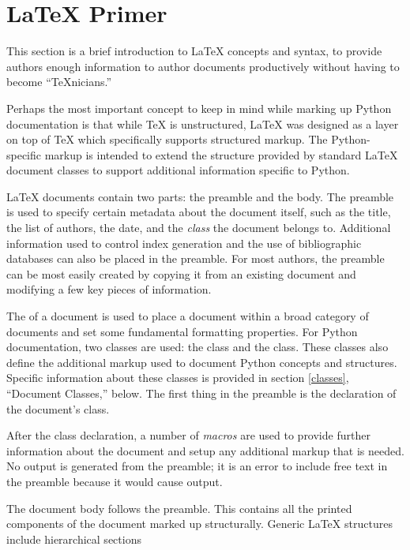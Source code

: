 \documentclass{howto}
\begin{document}
\section{\LaTeX{} Primer \label{latex-primer}}

  This section is a brief introduction to \LaTeX{} concepts and
  syntax, to provide authors enough information to author documents
  productively without having to become ``\TeX{}nicians.''

  Perhaps the most important concept to keep in mind while marking up
  Python documentation is that while \TeX{} is unstructured, \LaTeX{} was
  designed as a layer on top of \TeX{} which specifically supports 
  structured markup.  The Python-specific markup is intended to extend
  the structure provided by standard \LaTeX{} document classes to
  support additional information specific to Python.

  \LaTeX{} documents contain two parts: the preamble and the body.
  The preamble is used to specify certain metadata about the document
  itself, such as the title, the list of authors, the date, and the
  \emph{class} the document belongs to.  Additional information used
  to control index generation and the use of bibliographic databases
  can also be placed in the preamble.  For most authors, the preamble
  can be most easily created by copying it from an existing document
  and modifying a few key pieces of information.

  The  of a document is used to place a document within a
  broad category of documents and set some fundamental formatting
  properties.  For Python documentation, two classes are used: the
   class and the  class.  These classes also
  define the additional markup used to document Python concepts and
  structures.  Specific information about these classes is provided in
  section \ref{classes}, ``Document Classes,'' below.  The first thing
  in the preamble is the declaration of the document's class.

  After the class declaration, a number of \emph{macros} are used to
  provide further information about the document and setup any
  additional markup that is needed.  No output is generated from the
  preamble; it is an error to include free text in the preamble
  because it would cause output.

  The document body follows the preamble.  This contains all the
  printed components of the document marked up structurally.  Generic
  \LaTeX{} structures include hierarchical sections
\end{document}
